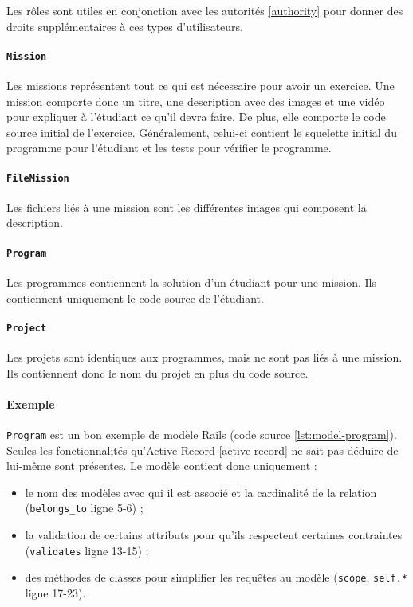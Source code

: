 Les rôles sont utiles en conjonction avec les autorités \ref{authority} pour donner des droits supplémentaires à ces types d'utilisateurs.

\paragraph{\texttt{Mission}} Les missions représentent tout ce qui est nécessaire pour avoir un exercice. Une mission comporte donc un titre, une description avec des images et une vidéo pour expliquer à l'étudiant ce qu'il devra faire. De plus, elle comporte le code source initial de l'exercice. Généralement, celui-ci contient le squelette initial du programme pour l'étudiant et les tests pour vérifier le programme.

\paragraph{\texttt{FileMission}} Les fichiers liés à une mission sont les différentes images qui composent la description.

\paragraph{\texttt{Program}} Les programmes contiennent la solution d'un étudiant pour une mission. Ils contiennent uniquement le code source de l'étudiant.

\paragraph{\texttt{Project}} Les projets sont identiques aux programmes, mais ne sont pas liés à une mission. Ils contiennent donc le nom du projet en plus du code source.

\paragraph{Exemple} \texttt{Program} est un bon exemple de modèle Rails (code source \ref{lst:model-program}). Seules les fonctionnalités qu’Active Record \ref{active-record} ne sait pas déduire de lui-même sont présentes. Le modèle contient donc uniquement :
\begin{itemize}
  \item le nom des modèles avec qui il est associé et la cardinalité de la relation (\lstinline[language=Rails]{belongs_to} ligne 5-6) ;
  \item la validation de certains attributs pour qu'ils respectent certaines contraintes (\lstinline[language=Rails]{validates} ligne 13-15) ;
  \item des méthodes de classes pour simplifier les requêtes au modèle (\lstinline[language=Rails]{scope},  \lstinline[language=Rails]{self.*} ligne 17-23).
\end{itemize}


